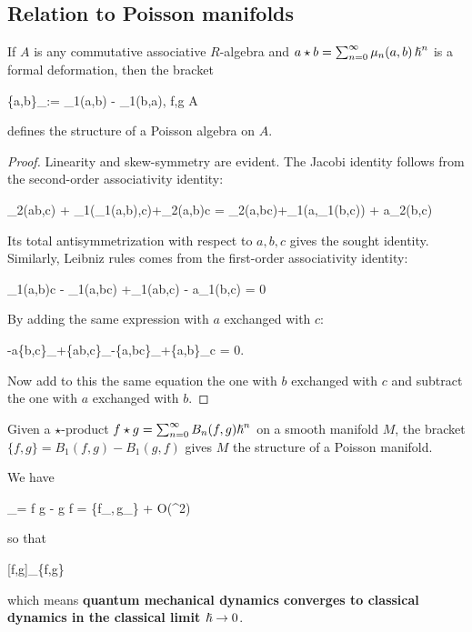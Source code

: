 \documentclass[main.tex]{subfiles}
\begin{document}
\subsection{Relation to Poisson manifolds}
\begin{proposition}
	If $A$ is any commutative associative $R$-algebra and $a \star b = \sum_{n=0}^\infty \mu_n(a,b)\,{\boldsymbol\hslash}^n$ is a formal deformation, then the bracket
	\begin{eqalign}
		\{a,b\}_\star := \mu_1(a,b) - \mu_1(b,a), \quad \forall f,g \in A
	\end{eqalign}
	defines the structure of a Poisson algebra on $A$.
\end{proposition}
\begin{proof}
	Linearity and skew-symmetry are evident. The Jacobi identity follows from the second-order associativity identity:
	\begin{eqalign}
		\mu_2(ab,c) + \mu_1(\mu_1(a,b),c)+\mu_2(a,b)c = \mu_2(a,bc)+\mu_1(a,\mu_1(b,c)) + a\mu_2(b,c)
	\end{eqalign}
	Its total antisymmetrization with respect to $a,b,c$ gives the sought identity. Similarly, Leibniz rules comes from the first-order associativity identity:
	\begin{eqalign}
		\mu_1(a,b)c - \mu_1(a,bc) +\mu_1(ab,c) - a\mu_1(b,c) = 0
	\end{eqalign}
	By adding the same expression with $a$ exchanged with $c$:
	\begin{eqalign}
		-a\{b,c\}_\star +\{ab,c\}_\star -\{a,bc\}_\star +\{a,b\}_\star c = 0.
	\end{eqalign}
	Now add to this the same equation the one with $b$ exchanged with $c$ and subtract the one with $a$ exchanged with $b$.
\end{proof}
\begin{corollary}
	Given a $\star$-product $f \star g = \sum_{n=0}^\infty B_n(f,g){\boldsymbol\hslash}^n$ on a smooth manifold $M$, the bracket $\{f,g\} = B_1(f,g) - B_1(g,f)$ gives $M$ the structure of a Poisson manifold.
\end{corollary}

\begin{remark}
	We have
	\begin{eqalign}
		[f,g]_\star = f \star g - g \star f = \planck \{f\vert_{},\,g\vert_{}\} + O(\planck^2)
	\end{eqalign}
	so that
	\begin{eqalign}
		[f,g]_\star \conv[\planck \to 0] \{f,g\}
	\end{eqalign}
	which means \textbf{quantum mechanical dynamics converges to classical dynamics in the classical limit ${\boldsymbol\hslash} \to 0$}.
\end{remark}
\end{document}

